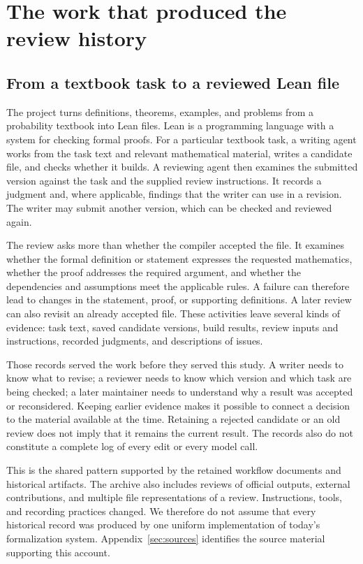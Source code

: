 \section{The work that produced the review history}
\label{sec:introduction}
\subsection{From a textbook task to a reviewed Lean file}
\label{subsec:workflow}
The project turns definitions, theorems, examples, and problems from a probability textbook into Lean files. Lean is a programming language with a system for checking formal proofs. For a particular textbook task, a writing agent works from the task text and relevant mathematical material, writes a candidate file, and checks whether it builds. A reviewing agent then examines the submitted version against the task and the supplied review instructions. It records a judgment and, where applicable, findings that the writer can use in a revision. The writer may submit another version, which can be checked and reviewed again.

The review asks more than whether the compiler accepted the file. It examines whether the formal definition or statement expresses the requested mathematics, whether the proof addresses the required argument, and whether the dependencies and assumptions meet the applicable rules. A failure can therefore lead to changes in the statement, proof, or supporting definitions. A later review can also revisit an already accepted file. These activities leave several kinds of evidence: task text, saved candidate versions, build results, review inputs and instructions, recorded judgments, and descriptions of issues.

Those records served the work before they served this study. A writer needs to know what to revise; a reviewer needs to know which version and which task are being checked; a later maintainer needs to understand why a result was accepted or reconsidered. Keeping earlier evidence makes it possible to connect a decision to the material available at the time. Retaining a rejected candidate or an old review does not imply that it remains the current result. The records also do not constitute a complete log of every edit or every model call.

This is the shared pattern supported by the retained workflow documents and historical artifacts. The archive also includes reviews of official outputs, external contributions, and multiple file representations of a review. Instructions, tools, and recording practices changed. We therefore do not assume that every historical record was produced by one uniform implementation of today's formalization system. Appendix~\ref{sec:sources} identifies the source material supporting this account.


